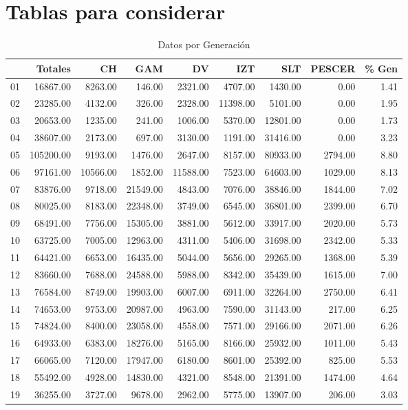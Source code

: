 \documentclass[12pt]{article}
\begin{document}
\section{Tablas para considerar}


\begin{table}[ht]
\centering
\caption{Datos por Generación} 
\begin{tabular}{r|r|rrrrrr|r}
  \hline
 & Totales & CH & GAM & DV & IZT & SLT & PESCER & \% Gen \\ 
  \hline
01 & 16867.00 & 8263.00 & 146.00 & 2321.00 & 4707.00 & 1430.00 & 0.00 & 1.41 \\ 
  02 & 23285.00 & 4132.00 & 326.00 & 2328.00 & 11398.00 & 5101.00 & 0.00 & 1.95 \\ 
  03 & 20653.00 & 1235.00 & 241.00 & 1006.00 & 5370.00 & 12801.00 & 0.00 & 1.73 \\ 
  04 & 38607.00 & 2173.00 & 697.00 & 3130.00 & 1191.00 & 31416.00 & 0.00 & 3.23 \\ 
  05 & 105200.00 & 9193.00 & 1476.00 & 2647.00 & 8157.00 & 80933.00 & 2794.00 & 8.80 \\ 
  06 & 97161.00 & 10566.00 & 1852.00 & 11588.00 & 7523.00 & 64603.00 & 1029.00 & 8.13 \\ 
  07 & 83876.00 & 9718.00 & 21549.00 & 4843.00 & 7076.00 & 38846.00 & 1844.00 & 7.02 \\ 
  08 & 80025.00 & 8183.00 & 22348.00 & 3749.00 & 6545.00 & 36801.00 & 2399.00 & 6.70 \\ 
  09 & 68491.00 & 7756.00 & 15305.00 & 3881.00 & 5612.00 & 33917.00 & 2020.00 & 5.73 \\ 
  10 & 63725.00 & 7005.00 & 12963.00 & 4311.00 & 5406.00 & 31698.00 & 2342.00 & 5.33 \\ 
  11 & 64421.00 & 6653.00 & 16435.00 & 5044.00 & 5656.00 & 29265.00 & 1368.00 & 5.39 \\ 
  12 & 83660.00 & 7688.00 & 24588.00 & 5988.00 & 8342.00 & 35439.00 & 1615.00 & 7.00 \\ 
  13 & 76584.00 & 8749.00 & 19903.00 & 6007.00 & 6911.00 & 32264.00 & 2750.00 & 6.41 \\ 
  14 & 74653.00 & 9753.00 & 20987.00 & 4963.00 & 7590.00 & 31143.00 & 217.00 & 6.25 \\ 
  15 & 74824.00 & 8400.00 & 23058.00 & 4558.00 & 7571.00 & 29166.00 & 2071.00 & 6.26 \\ 
  16 & 64933.00 & 6383.00 & 18276.00 & 5165.00 & 8166.00 & 25932.00 & 1011.00 & 5.43 \\ 
  17 & 66065.00 & 7120.00 & 17947.00 & 6180.00 & 8601.00 & 25392.00 & 825.00 & 5.53 \\ 
  18 & 55492.00 & 4928.00 & 14830.00 & 4321.00 & 8548.00 & 21391.00 & 1474.00 & 4.64 \\ 
  19 & 36255.00 & 3727.00 & 9678.00 & 2962.00 & 5775.00 & 13907.00 & 206.00 & 3.03 \\ 
   \hline
\end{tabular}
\end{table}
\end{document}

